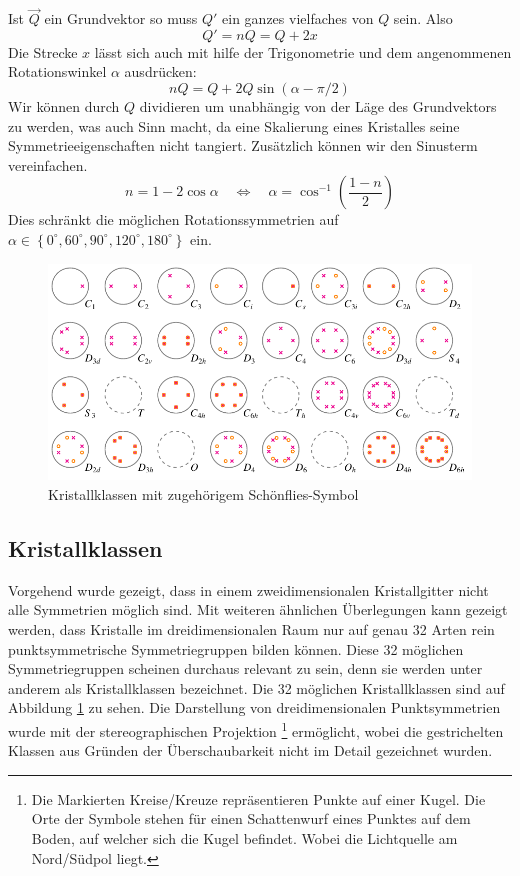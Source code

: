  Ist \(\vec{Q}\) ein Grundvektor so muss \(Q'\) ein ganzes vielfaches von \(Q\) sein.
 Also
 \[
    Q' = nQ = Q + 2x
 \]
 Die Strecke \(x\) lässt sich auch mit hilfe der Trigonometrie und dem angenommenen Rotationswinkel \(\alpha\) ausdrücken:
 \[
    nQ = Q + 2Q\sin(\alpha - \pi/2)
 \]
 Wir können durch \(Q\) dividieren um unabhängig von der Läge des Grundvektors zu werden, was auch Sinn macht, da eine Skalierung eines Kristalles seine Symmetrieeigenschaften nicht tangiert.
 Zusätzlich können wir den Sinusterm vereinfachen.
 \[
     n = 1 - 2\cos\alpha \quad\iff\quad
     \alpha = \cos^{-1}\left(\frac{1-n}{2}\right)
 \]
 Dies schränkt die möglichen Rotationssymmetrien auf 
 \(
     \alpha \in \left\{ 0^\circ, 60^\circ, 90^\circ, 120^\circ, 180^\circ\right\}
 \)
ein.

\begin{figure}
    \centering
    \includegraphics[]{papers/punktgruppen/figures/projections}
    \caption{Kristallklassen mit zugehörigem Schönflies-Symbol}
    \label{fig:punktgruppen:Kristallkassen}
\end{figure}

\subsection{Kristallklassen}
Vorgehend wurde gezeigt, dass in einem zweidimensionalen Kristallgitter nicht alle Symmetrien möglich sind.
Mit weiteren ähnlichen Überlegungen kann gezeigt werden, dass Kristalle im dreidimensionalen Raum
nur auf genau 32 Arten rein punktsymmetrische
Symmetriegruppen bilden können.
Diese 32 möglichen Symmetriegruppen scheinen durchaus relevant zu sein, denn sie werden unter anderem als Kristallklassen bezeichnet.
Die 32 möglichen Kristallklassen sind auf Abbildung \ref{fig:punktgruppen:Kristallkassen} zu sehen.
Die Darstellung von dreidimensionalen Punktsymmetrien wurde mit der stereographischen Projektion
\footnote{Die Markierten Kreise/Kreuze repräsentieren Punkte auf einer Kugel. 
Die Orte der Symbole stehen für einen Schattenwurf eines Punktes auf dem Boden, auf welcher sich die Kugel befindet.
Wobei die Lichtquelle am Nord/Südpol liegt.} 
ermöglicht, 
wobei die gestrichelten Klassen aus Gründen der Überschaubarkeit nicht im Detail gezeichnet wurden. 



